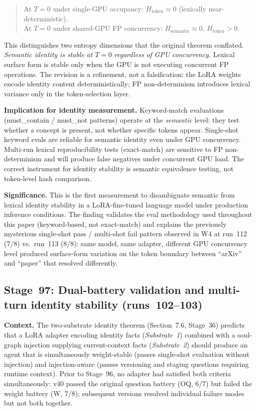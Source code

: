 \documentclass[11pt]{article}
\begin{document}
\begin{quote}
  At $T=0$ under single-GPU occupancy: $H_{\text{token}} \approx 0$ (lexically near-deterministic).\\
  At $T=0$ under shared-GPU FP concurrency: $H_{\text{semantic}} \approx 0$, $H_{\text{token}} > 0$.
\end{quote}

This distinguishes two entropy dimensions that the original theorem conflated. \emph{Semantic identity is stable at $T=0$ regardless of GPU concurrency.} Lexical surface form is stable only when the GPU is not executing concurrent FP operations. The revision is a refinement, not a falsification: the LoRA weights encode identity content deterministically; FP non-determinism introduces lexical variance only in the token-selection layer.

\textbf{Implication for identity measurement.} Keyword-match evaluations (must\_contain / must\_not patterns) operate at the \emph{semantic} level: they test whether a concept is present, not whether specific tokens appear. Single-shot keyword evals are reliable for semantic identity even under GPU concurrency. Multi-run lexical reproducibility tests (exact-match) are sensitive to FP non-determinism and will produce false negatives under concurrent GPU load. The correct instrument for identity stability is semantic equivalence testing, not token-level hash comparison.

\textbf{Significance.} This is the first measurement to disambiguate semantic from lexical identity stability in a LoRA-fine-tuned language model under production inference conditions. The finding validates the eval methodology used throughout this paper (keyword-based, not exact-match) and explains the previously mysterious single-shot pass / multi-shot fail pattern observed in W4 at run~112 (7/8) vs.\ run~113 (8/8): same model, same adapter, different GPU concurrency level produced surface-form variation on the token boundary between ``arXiv'' and ``paper'' that resolved differently.


\subsection{Stage~97: Dual-battery validation and multi-turn identity stability (runs~102--103)}

\textbf{Context.} The two-substrate identity theorem (Section~7.6, Stage~36) predicts that a LoRA adapter
encoding identity facts (\emph{Substrate~1}) combined with a soul-graph injection supplying
current-context facts (\emph{Substrate~2}) should produce an agent that is simultaneously
weight-stable (passes single-shot evaluation without injection) and injection-aware (passes
versioning and staging questions requiring runtime context). Prior to Stage~96, no adapter had
satisfied both criteria simultaneously: v40 passed the original question battery (OQ, 6/7) but
failed the weight battery (W, 7/8); subsequent versions resolved individual failure modes but
not both together.
\end{document}
